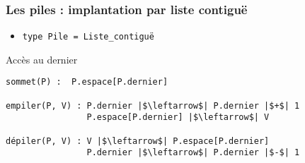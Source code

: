 \documentclass[table,handout,tikz,12pt,svgnames]{beamer}
\begin{document}
%
%			
%	


\begin{frame}[fragile=singleslide]
	\frametitle{Les piles : implantation par liste contiguë}
	\begin{block}{}
		\begin{itemize}
			\item  \texttt{type Pile = Liste\_contiguë}
		\end{itemize}
	\end{block}	
	\begin{block}{Accès au dernier}
		\begin{verbatim}
sommet(P) :  P.espace[P.dernier]

empiler(P, V) : P.dernier |$\leftarrow$| P.dernier |$+$| 1
				P.espace[P.dernier] |$\leftarrow$| V
				
dépiler(P, V) : V |$\leftarrow$| P.espace[P.dernier]
				P.dernier |$\leftarrow$| P.dernier |$-$| 1
		\end{verbatim}
	\end{block}	
\end{frame}
\end{document}
